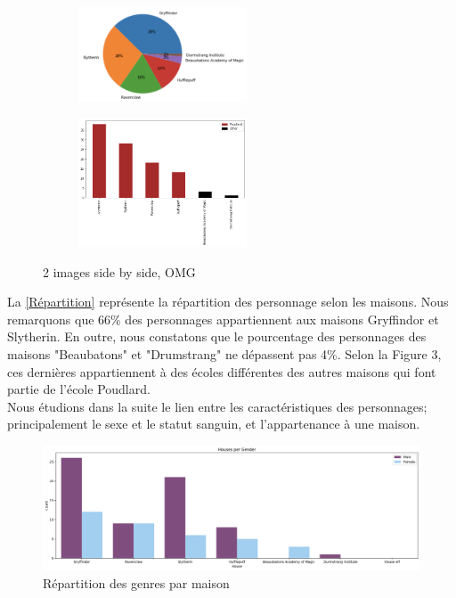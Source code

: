 \documentclass[11pt]{article}
\begin{document}
\begin{figure}[H]
    \centering
    \begin{subfigure}[b]{0.6\textwidth}
        \includegraphics[width=5cm]{./figures/rep.png}
    \end{subfigure}
    \begin{subfigure}[b]{0.3\textwidth}
        \includegraphics[width=5cm]{./figures/houses.png}
    \end{subfigure}
    \caption{2 images side by side, OMG}
\end{figure}

La \autoref{Répartition} représente la répartition des personnage selon les maisons. Nous remarquons que 66\% des personnages appartiennent aux maisons Gryffindor et Slytherin. En outre, nous constatons que le pourcentage des personnages des maisons "Beaubatons" et "Drumstrang" ne dépassent pas 4\%. Selon la Figure 3, ces dernières appartiennent à des écoles différentes des autres maisons qui font partie de l'école Poudlard.\\ 

Nous étudions dans la suite le lien entre les caractéristiques des personnages; principalement le sexe et le statut sanguin, et l'appartenance à une maison.

\begin{figure}
\centering
    \includegraphics[width= 15 cm]{./figures/Houses per gender 1.png}
     \caption{Répartition des genres par maison}
\end{figure}
\end{document}
